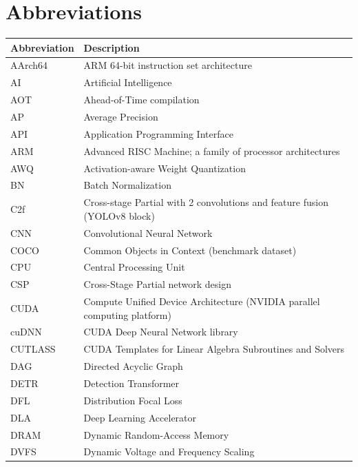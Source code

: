 \documentclass[12pt,a4paper]{report}
\begin{document}
\chapter*{Abbreviations}
\begin{longtable}{@{}p{3cm}p{10cm}@{}}
\toprule
\textbf{Abbreviation} & \textbf{Description} \\
\midrule
\endhead
\bottomrule
\endfoot

AArch64      & ARM 64-bit instruction set architecture \\[2pt]
AI           & Artificial Intelligence \\[2pt]
AOT          & Ahead-of-Time compilation \\[2pt]
AP           & Average Precision \\[2pt]
API          & Application Programming Interface \\[2pt]
ARM          & Advanced RISC Machine; a family of processor architectures \\[2pt]
AWQ          & Activation-aware Weight Quantization \\[2pt]
BN           & Batch Normalization \\[2pt]
C2f          & Cross-stage Partial with 2 convolutions and feature fusion (YOLOv8 block) \\[2pt]
CNN          & Convolutional Neural Network \\[2pt]
COCO         & Common Objects in Context (benchmark dataset) \\[2pt]
CPU          & Central Processing Unit \\[2pt]
CSP          & Cross-Stage Partial network design \\[2pt]
CUDA         & Compute Unified Device Architecture (NVIDIA parallel computing platform) \\[2pt]
cuDNN        & CUDA Deep Neural Network library \\[2pt]
CUTLASS      & CUDA Templates for Linear Algebra Subroutines and Solvers \\[2pt]
DAG          & Directed Acyclic Graph \\[2pt]
DETR         & Detection Transformer \\[2pt]
DFL          & Distribution Focal Loss \\[2pt]
DLA          & Deep Learning Accelerator \\[2pt]
DRAM         & Dynamic Random-Access Memory \\[2pt]
DVFS         & Dynamic Voltage and Frequency Scaling \\[2pt]

\end{longtable}
\end{document}
